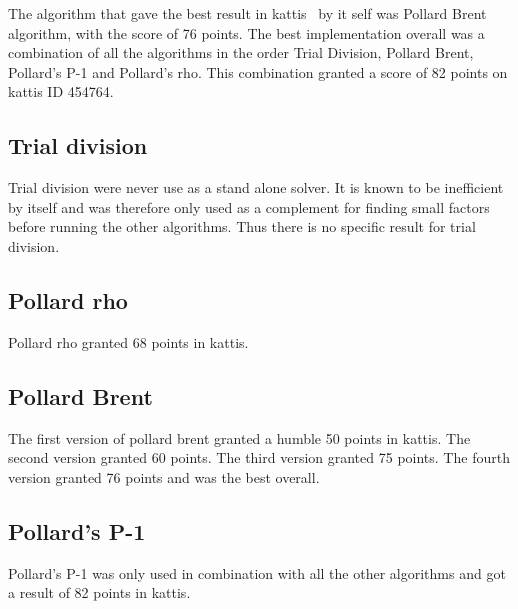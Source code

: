 The algorithm that gave the best result in kattis~\cite{kattis} by it self was Pollard Brent algorithm, with the score of 76 points. The best implementation overall was a combination of all the algorithms in the order Trial Division, Pollard Brent, Pollard’s P-1 and Pollard’s rho. This combination granted a score of 82 points on kattis ID 454764.

\subsection{Trial division}

Trial division were never use as a stand alone solver. It is known to be inefficient by itself and was therefore only used as a complement for finding small factors before running the other algorithms. Thus there is no specific result for trial division.

\subsection{Pollard rho}

Pollard rho granted 68 points in kattis.

\subsection{Pollard Brent}

The first version of pollard brent granted a humble 50 points in kattis. The second version granted 60 points. The third version granted 75 points. The fourth version granted 76 points and was the best overall.

\subsection{Pollard's P-1}

Pollard’s P-1 was only used in combination with all the other algorithms and got a result of 82 points in kattis.

